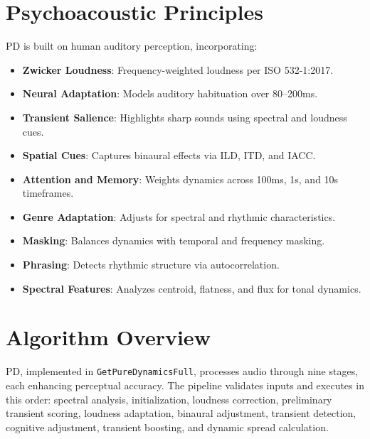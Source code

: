 \documentclass[11pt]{article}
\begin{document}
\section{Psychoacoustic Principles}
PD is built on human auditory perception, incorporating:
\begin{itemize}[label=$\bullet$]
  \item \textbf{Zwicker Loudness}: Frequency-weighted loudness per ISO 532-1:2017.
  \item \textbf{Neural Adaptation}: Models auditory habituation over 80--200ms.
  \item \textbf{Transient Salience}: Highlights sharp sounds using spectral and loudness cues.
  \item \textbf{Spatial Cues}: Captures binaural effects via ILD, ITD, and IACC.
  \item \textbf{Attention and Memory}: Weights dynamics across 100ms, 1s, and 10s timeframes.
  \item \textbf{Genre Adaptation}: Adjusts for spectral and rhythmic characteristics.
  \item \textbf{Masking}: Balances dynamics with temporal and frequency masking.
  \item \textbf{Phrasing}: Detects rhythmic structure via autocorrelation.
  \item \textbf{Spectral Features}: Analyzes centroid, flatness, and flux for tonal dynamics.
\end{itemize}

\section{Algorithm Overview}
PD, implemented in \texttt{GetPureDynamicsFull}, processes audio through nine stages, each enhancing perceptual accuracy. The pipeline validates inputs and executes in this order: spectral analysis, initialization, loudness correction, preliminary transient scoring, loudness adaptation, binaural adjustment, transient detection, cognitive adjustment, transient boosting, and dynamic spread calculation.
\end{document}

